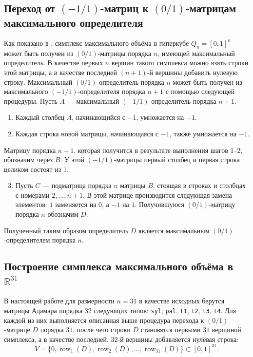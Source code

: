 \documentclass[a4paper,12pt]{article}
\theoremstyle{indented}
\begin{document}
\subsection{Переход от $(-1/1)$-матриц к $(0/1)$-матрицам максимального определителя}

Как показано в \cite{nevsky_geo}, симплекс максимального объёма в гиперкубе $Q_n = [0,1]^n$ может быть получен из $(0/1)$-матрицы порядка $n$, имеющей максимальный определитель. В качестве первых $n$ вершин такого симплекса можно взять строки этой матрицы, а в качестве последней $(n+1)$-й вершины добавить нулевую строку.
Максимальный $(0/1)$-определитель порядка $n$ может быть получен из максимального $(-1/1)$-определителя порядка $n+1$ с помощью следующей процедуры. Пусть $A$ — максимальный $(-1/1)$-определитель порядка $n+1$.

\begin{enumerate}
    \item Каждый столбец $A$, начинающийся с $-1$, умножается на $-1$.
    \item Каждая строка новой матрицы, начинающаяся с $-1$, также умножается на $-1$.
\end{enumerate}

Матрицу порядка $n+1$, которая получится в результате выполнения шагов 1–2, обозначим через $B$. У этой $(-1/1)$-матрицы первый столбец и первая строка целиком состоят из $1$.

\begin{enumerate}
    \setcounter{enumi}{2}
    \item Пусть $C$ — подматрица порядка $n$ матрицы $B$, стоящая в строках и столбцах с номерами $2, \dots, n+1$. В этой матрице производится следующая замена элементов: $1$ заменяется на $0$, а $-1$ на $1$. Получившуюся $(0/1)$-матрицу порядка $n$ обозначим $D$.
\end{enumerate}

Полученный таким образом определитель $D$ является максимальным $(0/1)$-определителем порядка $n$.

\subsection{Построение симплекса максимального объёма в $\mathbb{R}^{31}$}

В настоящей работе для размерности $n = 31$ в качестве исходных берутся матрицы Адамара порядка $32$ следующих типов: \texttt{syl}, \texttt{pal}, \texttt{t1}, \texttt{t2}, \texttt{t3}, \texttt{t4}. Для каждой из них выполняется описанная выше процедура перехода к $(0/1)$-матрице $D$ порядка $31$, после чего строки $D$ становятся первыми $31$ вершиной симплекса, а в качестве последней, $32$-й вершины добавляется нулевая строка:
\[
V = \{0, \operatorname{row}_1(D), \operatorname{row}_2(D), \dots, \operatorname{row}_{31}(D)\} \subset [0,1]^{31}.
\]
\end{document}
